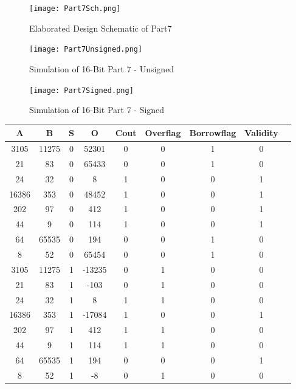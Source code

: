 \documentclass[pdftex,12pt,a4paper]{article}
\begin{document}
\begin{figure}[ht]
	\centering
	\texttt{[image: Part7Sch.png]}
	\caption{Elaborated Design Schematic of Part7}
	\label{fig1}
\end{figure}

\begin{figure}[ht]
	\centering
	\texttt{[image: Part7Unsigned.png]}
	\caption{Simulation of 16-Bit Part 7 - Unsigned}
	\label{fig1}
\end{figure}

\begin{figure}[ht]
	\centering
	\texttt{[image: Part7Signed.png]}
	\caption{Simulation of 16-Bit Part 7 - Signed}
	\label{fig1}
\end{figure}

\begin{center}
 \begin{tabular}{|c|c|c|c|c|c|c|c|c|} 
 \hline
 A & B & S & O & Cout & Overflag & Borrowflag & Validity  \\ 
 \hline\hline
 3105 & 11275 & 0 & 52301 & 0 & 0 & 1 & 0\\ 
 \hline
 21 & 83 & 0 & 65433 & 0 & 0 & 1 & 0\\
 \hline
 24 & 32 & 0 & 8 & 1 & 0 & 0 & 1\\
 \hline
 16386 & 353 & 0 & 48452 & 1 & 0 & 0 & 1\\
 \hline
 202 & 97 & 0 & 412 & 1 & 0 & 0 & 1\\
 \hline
 44 & 9 & 0 & 114 &  1 & 0 & 0 & 1\\
 \hline
 64 & 65535 & 0 & 194 & 0 & 0 & 1 & 0\\
 \hline
 8 & 52 & 0 & 65454 & 0 & 0 & 1 & 0\\
 \hline
 3105 & 11275 & 1 & -13235 & 0 & 1 & 0 & 0\\ 
 \hline
 21 & 83 & 1 & -103 & 0 & 1 & 0 & 0\\
 \hline
 24 & 32 & 1 & 8 & 1 & 1 & 0 & 0\\
 \hline
 16386 & 353 & 1 & -17084 & 1 & 0 & 0 & 1\\
 \hline
 202 & 97 & 1 & 412 & 1 & 1 & 0 & 0\\
 \hline
 44 & 9 & 1 & 114 & 1 & 1 & 0 & 0\\
 \hline
 64 & 65535 & 1 & 194 & 0 & 0 & 0 & 1\\
 \hline
 8 & 52 & 1 & -8 & 0 & 1 & 0 & 0\\
 \hline
\end{tabular}
\end{center}
\end{document}
